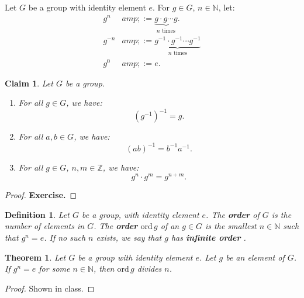 \documentclass[a4paper,12pt]{report}
\newcommand{\ord}{\mathrm{ord}\,}
\renewcommand{\ord}{\mathrm{ord}\,}
\newcounter{statement}
\numberwithin{statement}{chapter}
\newtheorem{thm}[statement]{Theorem}
\newtheorem{defn}[statement]{Definition}
\newtheorem{claim}[statement]{Claim}
\numberwithin{equation}{chapter}
\numberwithin{section}{chapter}
\numberwithin{subsection}{section}
\begin{document}
Let $G$ be a group with identity element $e$.
For $g \in G$, $n \in \mathbb{N}$,
let:
\[\begin{split}
g^n &amp;:= \underbrace{g \cdot g \cdots g}_{n\text{ times}}.\\
g^{-n} &amp;:= \underbrace{g^{-1} \cdot g^{-1} \cdots g^{-1}}_{n\text{ times}}\\
g^0 &amp;:= e.
\end{split}\]
\begin{claim}

Let $G$ be a group.
\begin{enumerate}
\item 
For all $g \in G$,
we have:
\[(g^{-1})^{-1} = g.\]
  
\item 
For all $a, b \in G$,
we have:
\[(ab)^{-1} = b^{-1}a^{-1}.\]
  
\item 
For all $g \in G$, $n, m \in \mathbb{Z}$, we have:
\[g^n\cdot g^m = g^{n + m}.\]
  \end{enumerate}
\end{claim}
\begin{proof}

 {\bf Exercise.} 
\end{proof}

\begin{defn}
Let $G$ be a group, with identity element $e$.
The  {\bf order}  of $G$ is the number of elements in $G$.
The  {\bf order}  $\ord g$ of an  $g \in G$
is the smallest $n \in \mathbb{N}$ such that $g^n = e$.
If no such $n$ exists, we say that $g$ has  {\bf infinite order} .
\end{defn}
\begin{thm}

Let $G$ be a group with identity element $e$.
Let $g$ be an element of $G$. If $g^n = e$ for some $n \in \mathbb{N}$,
then $\ord g$ divides $n$.
\end{thm}
\begin{proof}

Shown in class.
\end{proof}
\end{document}
